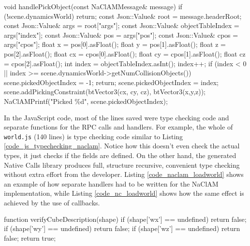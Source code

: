 \begin{code}
void handlePickObject(const NaClAMMessage& message) {
  if (!scene.dynamicsWorld) {
    return;
  }
  const Json::Value& root = message.headerRoot;
  const Json::Value& args = root["args"];
  const Json::Value& objectTableIndex = args["index"];
  const Json::Value& pos = args["pos"];
  const Json::Value& cpos = args["cpos"];
  float x = pos[0].asFloat();
  float y = pos[1].asFloat();
  float z = pos[2].asFloat();
  float cx = cpos[0].asFloat();
  float cy = cpos[1].asFloat();
  float cz = cpos[2].asFloat();
  int index = objectTableIndex.asInt();
  index++;
  if (index < 0 || 
             index >= scene.dynamicsWorld->getNumCollisionObjects()) {
    scene.pickedObjectIndex = -1;
    return;
  }
  scene.pickedObjectIndex = index;
  scene.addPickingConstraint(btVector3(cx, cy, cz), btVector3(x,y,z));
  NaClAMPrintf("Picked \%d\n", scene.pickedObjectIndex);
}
\end{code}

In the JavaScript code, most of the lines saved were type checking code and separate functions for the RPC calls and handlers. For example, the whole of \lstinline{world.js} (140 lines) is type checking code similar to Listing \ref{code_js_typechecking_naclam}. Notice how this doesn't even check the actual types, it just checks if the fields are defined. On the other hand, the generated Native Calls library produces full, structure recursive, convenient type checking without extra effort from the developer. Listing \ref{code_naclam_loadworld} shows an example of how separate handlers had to be written for the NaClAM implementation, while Listing \ref{code_nc_loadworld} shows how the same effect is achieved by the use of callbacks.

\begin{code}
function verifyCubeDescription(shape) {
  if (shape['wx'] == undefined) {
    return false;
  }
  if (shape['wy'] == undefined) {
    return false;
  }
  if (shape['wz'] == undefined) {
    return false;
  }
  return true;
}
\end{code}

